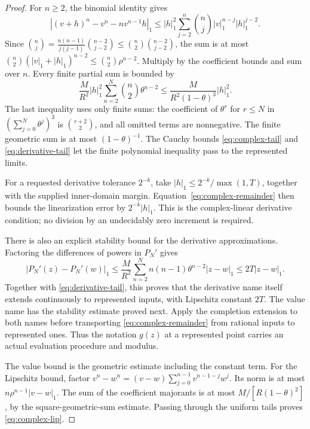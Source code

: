 \begin{proof}
For \(n\geq2\), the binomial identity gives
\[
 |(v+h)^n-v^n-nv^{n-1}h|_1
 \leq |h|_1^2\sum_{j=2}^n \binom{n}{j}|v|_1^{n-j}|h|_1^{j-2}.
\]
Since
\(\binom{n}{j}=\frac{n(n-1)}{j(j-1)}\binom{n-2}{j-2}\leq\binom{n}{2}\binom{n-2}{j-2}\),
the sum is at most
\(\binom{n}{2}(|v|_1+|h|_1)^{n-2}\leq\binom{n}{2}\rho^{n-2}\).
Multiply by the coefficient bounds and sum over \(n\). Every finite partial sum is bounded by
\[
 \frac{M}{R^2}|h|_1^2
       \sum_{n=2}^{N}\binom{n}{2}\theta^{n-2}
 \leq\frac{M}{R^2(1-\theta)^3}|h|_1^2.
\]
The last inequality uses only finite sums: the coefficient of \(\theta^r\) for \(r\leq N\) in \((\sum_{j=0}^N\theta^j)^3\) is \(\binom{r+2}{2}\), and all omitted terms are nonnegative. The finite geometric sum is at most \((1-\theta)^{-1}\). The Cauchy bounds \eqref{eq:complex-tail} and \eqref{eq:derivative-tail} let the finite polynomial inequality pass to the represented limits.

For a requested derivative tolerance \(2^{-k}\), take \(|h|_1\leq2^{-k}/\max(1,T)\), together with the supplied inner-domain margin. Equation~\eqref{eq:complex-remainder} then bounds the linearization error by \(2^{-k}|h|_1\). This is the complex-linear derivative condition; no division by an undecidably zero increment is required.

There is also an explicit stability bound for the derivative approximations. Factoring the differences of powers in \(P_N'\) gives
\[
 |P_N'(z)-P_N'(w)|_1
 \leq\frac{M}{R^2}\sum_{n=2}^N n(n-1)\theta^{n-2}|z-w|_1
 \leq2T|z-w|_1.
\]
Together with \eqref{eq:derivative-tail}, this proves that the derivative name itself extends continuously to represented inputs, with Lipschitz constant \(2T\). The value name has the stability estimate proved next. Apply the completion extension to both names before transporting \eqref{eq:complex-remainder} from rational inputs to represented ones. Thus the notation \(g(z)\) at a represented point carries an actual evaluation procedure and modulus.

The value bound is the geometric estimate including the constant term. For the Lipschitz bound, factor
\(v^n-w^n=(v-w)\sum_{j=0}^{n-1}v^{n-1-j}w^j\).
Its norm is at most \(n\rho^{n-1}|v-w|_1\). The sum of the coefficient majorants is at most \(M/[R(1-\theta)^2]\), by the square-geometric-sum estimate. Passing through the uniform tails proves \eqref{eq:complex-lip}.
\end{proof}


